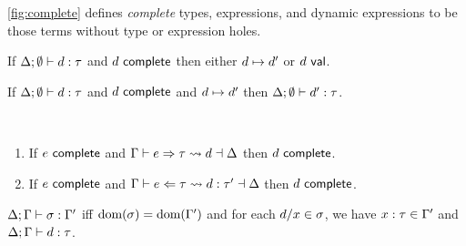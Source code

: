 \autoref{fig:complete} defines \emph{complete} types, expressions, and
dynamic expressions to be those terms without type or expression holes.

\begin{theorem}
  If $\Delta; \emptyset \vdash d : \tau$
  and $d~\mathsf{complete}$
  then either $d \mapsto d'$
  or $d~\mathsf{val}$.
\end{theorem}

\begin{theorem}
  If $\Delta; \emptyset \vdash d : \tau$
  and $d~\mathsf{complete}$
  and $d \mapsto d'$
  then $\Delta; \emptyset \vdash d' : \tau$.
\end{theorem}

\begin{theorem} ~
  \begin{enumerate}
    \item
      If $e~\mathsf{complete}$
      and $\Gamma \vdash e \Rightarrow \tau \leadsto d \dashv \Delta$
      then $d~\mathsf{complete}$.
    \item
      If $e~\mathsf{complete}$
      and $\Gamma \vdash e \Leftarrow \tau \leadsto d : \tau' \dashv \Delta$
      then $d~\mathsf{complete}$.
  \end{enumerate}
\end{theorem}








  \begin{definition}
    $\Delta; \Gamma \vdash \sigma : \Gamma'$ iff $\text{dom}(\sigma) = \text{dom}(\Gamma')$ and for each $d/x \in \sigma$, we have $x : \tau \in \Gamma'$ and $\Delta; \Gamma \vdash d : \tau$.
  \end{definition}



